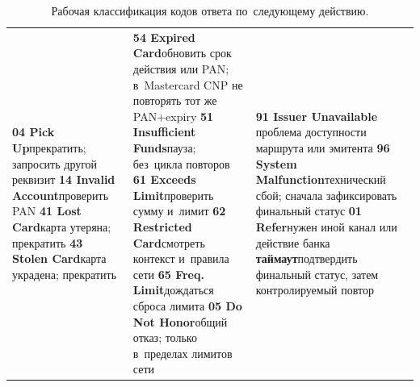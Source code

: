 \begin{table}[H]
  \caption{Рабочая классификация кодов ответа по~следующему действию.}\label{tab:decline-codes}
  \begingroup
  \tablesetup
  \begin{tabularx}{\textwidth}{@{}Y Y Y@{}}
    \toprule
    \headrow
     &
     &
     \\
    \midrule
    \textbf{04 Pick Up}\newline прекратить; запросить другой реквизит
    \newline\textbf{14 Invalid Account}\newline проверить PAN
    \newline\textbf{41 Lost Card}\newline карта утеряна; прекратить
    \newline\textbf{43 Stolen Card}\newline карта украдена; прекратить
    &
    \textbf{54 Expired Card}\newline обновить срок
    действия или PAN; в~Mastercard CNP не повторять тот же PAN+expiry
    \newline\textbf{51 Insufficient Funds}\newline пауза; без~цикла повторов
    \newline\textbf{61 Exceeds Limit}\newline проверить сумму и~лимит
    \newline\textbf{62 Restricted Card}\newline смотреть контекст и~правила сети
    \newline\textbf{65 Freq. Limit}\newline дождаться сброса лимита
    \newline\textbf{05 Do Not Honor}\newline общий отказ; только в~пределах лимитов сети &
    \textbf{91 Issuer Unavailable}\newline
    проблема доступности маршрута или эмитента
    \newline\textbf{96 System Malfunction}\newline технический сбой;
    сначала зафиксировать финальный статус
    \newline\textbf{01 Refer}\newline нужен иной канал или действие банка
    \newline\textbf{таймаут}\newline подтвердить финальный статус,
    затем контролируемый повтор \\
    \bottomrule
  \end{tabularx}\par
  \endgroup
\end{table}

